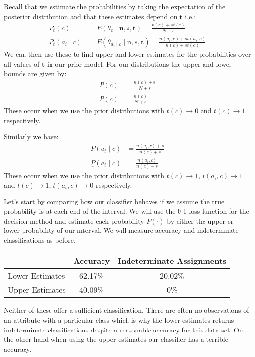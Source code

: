 Recall that we estimate the probabilities by taking the expectation of the posterior distribution and that these estimates depend on $\mathbf{t}$ i.e.:
\begin{align}
	P_t(c) & = E(\theta_c \mid \mathbf{n},s,\mathbf{t}) = \frac{n(c) + st(c)}{N + s} \\
	P_t(a_i \mid c) & = E(\theta_{a_i \mid c} \mid \mathbf{n},s,\mathbf{t}) = \frac{n(a_i, c) + st(a_i, c)}{n(c) + st(c)}
\end{align}
We can then use these to find upper and lower estimates for the probabilities over all values of $\mathbf{t}$ in our prior model.
For our distributions the upper and lower bounds are given by:
\begin{align}
	\overline{P}(c) & = \frac{n(c) + s}{N+s} \\
	\underline{P}(c) & = \frac{n(c)}{N+s}
\end{align}
These occur when we use the prior distributions with $t(c) \rightarrow 0$ and $t(c) \rightarrow 1$ respectively.

Similarly we have:
\begin{align}
	\overline{P}(a_i \mid c) & = \frac{n(a_i, c) + s}{n(c)+s} \\
	\underline{P}(a_i \mid c) & = \frac{n(a_i, c)}{n(c)+s}
\end{align}
These occur when we use the prior distributions with $t(c) \rightarrow 1$, $t(a_i, c)\rightarrow1$ and $t(c) \rightarrow 1$, $t(a_i, c)\rightarrow0$ respectively.

Let's start by comparing how our classifier behaves if we assume the true probability is at each end of the interval.
We will use the 0-1 loss function for the decision method and estimate each probability $P(\cdot)$ by either the upper or lower probability of our interval.
We will measure accuracy and indeterminate classifications as before.

\begin{center}
	\begin{tabular}{l|c c}
	                & Accuracy & Indeterminate Assignments \\
	\hline
	Lower Estimates & 62.17\%  & 20.02\%            \\
	Upper Estimates & 40.09\%  & 0\%                \\
	\end{tabular}
\end{center}

Neither of these offer a sufficient classification.
There are often no observations of an attribute with a particular class which is why the lower estimates returns indeterminate classifications despite a reasonable accuracy for this data set.
On the other hand when using the upper estimates our classifier has a terrible accuracy.

